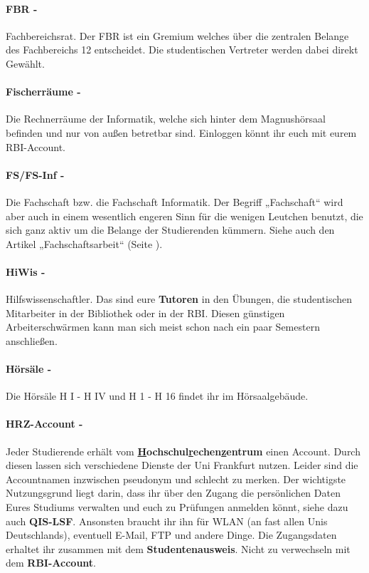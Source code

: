 \paragraph{FBR -} \glqq Fachbereichsrat\grqq. Der FBR ist ein Gremium welches über die zentralen Belange des Fachbereichs 12 entscheidet. Die studentischen Vertreter werden dabei direkt Gewählt.
\paragraph{Fischerräume -} Die Rechnerräume der Informatik, welche sich hinter dem Magnushörsaal befinden und nur von außen  betretbar sind. Einloggen könnt ihr euch mit eurem RBI-Account.
\paragraph{FS/FS-Inf -} Die Fachschaft bzw. die Fachschaft Informatik. Der Begriff „Fachschaft“ wird aber auch in einem wesentlich engeren Sinn für die wenigen Leutchen benutzt, die sich ganz aktiv um die Belange der Studierenden kümmern. Siehe auch den Artikel „Fachschaftsarbeit“ (Seite \pageref{fachschaftsarbeit}).
\paragraph{HiWis -} Hilfswissenschaftler. Das sind eure \textbf{Tutoren} in den Übungen, die studentischen Mitarbeiter in der Bibliothek oder in der RBI. Diesen günstigen Arbeiterschwärmen kann man sich meist schon nach ein paar Semestern anschließen.
\paragraph{Hörsäle -} Die Hörsäle H I - H IV und H 1 - H 16 findet ihr im Hörsaalgebäude.
\paragraph{HRZ-Account -} Jeder Studierende erhält vom \textbf{\underline{H}ochschul\underline{r}echen\underline{z}entrum} einen Account. Durch diesen lassen sich verschiedene Dienste der Uni Frankfurt nutzen. Leider sind die Accountnamen inzwischen pseudonym und schlecht zu merken. Der wichtigste Nutzungsgrund liegt darin, dass ihr über den Zugang die persönlichen Daten Eures Studiums verwalten und euch zu Prüfungen anmelden könnt, siehe dazu auch \textbf{QIS-LSF}. Ansonsten braucht ihr ihn für WLAN (an fast allen Unis Deutschlands), eventuell E-Mail, FTP und andere Dinge. Die Zugangsdaten erhaltet ihr zusammen mit dem \textbf{Studentenausweis}. Nicht zu verwechseln mit dem \textbf{RBI-Account}.

